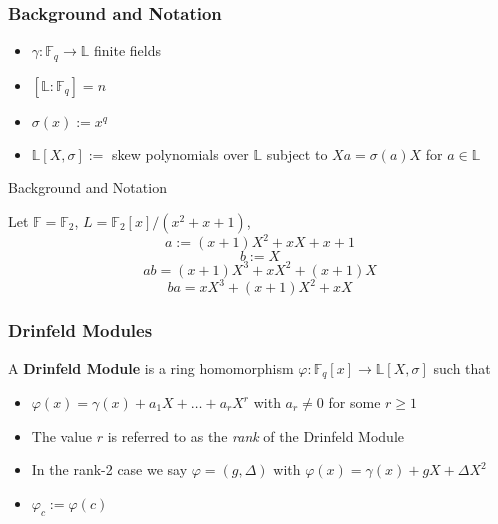 \documentclass{beamer}
\newcommand{\F}{\mathbb{F}}
\newcommand{\f}{\mathbb{F}}
\begin{document}
\begin{frame}
\frametitle{Background and Notation}

\begin{itemize}

\item $\gamma: \mathbb{F}_q \to \mathbb{L}$ finite fields
\item $[\mathbb{L} : \F_q] = n$
\item $\sigma(x) := x^q$
\item $\mathbb{L}[X,\sigma] := $ skew polynomials over $\mathbb{L}$ subject to $Xa = \sigma(a)X$ for $a \in \mathbb{L}$ 

\end{itemize}
\end{frame}
\begin{frame}{Background and Notation}

\begin{example}
Let $\mathbb{F} = \f_2$, $L = \f_2[x]/(x^2 + x + 1)$, %
\[ a:= (x + 1)X^2 + xX + x + 1 \]
\[b := X\]
\[ab = (x + 1)X^3 + xX^2 + (x + 1)X\]
\[ba = xX^3 + (x+1)X^2 + xX \]
\end{example}



\end{frame}












\begin{frame}
\frametitle{Drinfeld Modules}

\begin{definition}
A \textbf{Drinfeld Module} is a ring homomorphism $\varphi: \mathbb{F}_q[x] \to \mathbb{L}[X,\sigma]$ such that 

\begin{itemize}
    \item $\varphi(x) = \gamma(x) + a_1X + \ldots + a_rX^r$ with $a_r \neq 0$ for some $r \geq 1$
\end{itemize}
\end{definition}

\begin{itemize}
    \item The value $r$ is referred to as the \textit{rank} of the Drinfeld Module
        \item In the rank-2 case we say $\varphi = (g, \Delta)$ with $\varphi(x) = \gamma(x) + gX + \Delta X^2$
        \item 
 $\varphi_c := \varphi(c)$
 
 \end{itemize}
 \end{frame}
 
\end{document}
